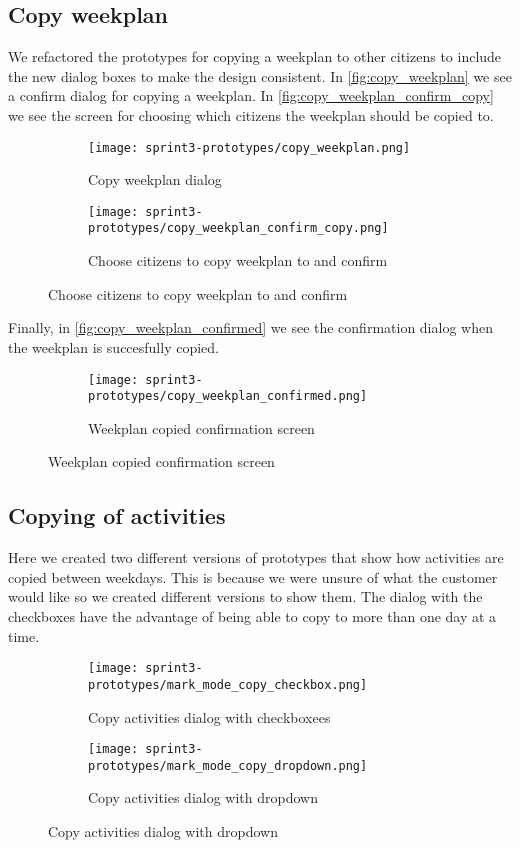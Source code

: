 \subsection{Copy weekplan}
We refactored the prototypes for copying a weekplan to other citizens to include the new dialog boxes to make the design consistent. In \autoref{fig:copy_weekplan} we see a confirm dialog for copying a weekplan. In \autoref{fig:copy_weekplan_confirm_copy} we see the screen for choosing which citizens the weekplan should be copied to. 
\begin{figure}[H]
    \begin{subfigure}{0.5\textwidth}
    \texttt{[image: sprint3-prototypes/copy\_weekplan.png]} 
    \caption{Copy weekplan dialog}
    \label{fig:copy_weekplan}
    \end{subfigure}
    \begin{subfigure}{0.5\textwidth}
        \texttt{[image: sprint3-prototypes/copy\_weekplan\_confirm\_copy.png]}
    \caption{Choose citizens to copy weekplan to and confirm}
    \label{fig:copy_weekplan_confirm_copy}
    \end{subfigure} 
\end{figure}
Finally, in \autoref{fig:copy_weekplan_confirmed} we see the confirmation dialog when the weekplan is succesfully copied.
\begin{figure}[H]
    \begin{subfigure}{0.5\textwidth}
    \texttt{[image: sprint3-prototypes/copy\_weekplan\_confirmed.png]} 
    \caption{Weekplan copied confirmation screen}
    \label{fig:copy_weekplan_confirmed}
    \end{subfigure}
\end{figure}

\subsection{Copying of activities}
Here we created two different versions of prototypes that show how activities are copied between weekdays. This is because we were unsure of what the customer would like so we created different versions to show them. The dialog with the checkboxes have the advantage of being able to copy to more than one day at a time.
\begin{figure}[H]
    \begin{subfigure}{0.5\textwidth}
    \texttt{[image: sprint3-prototypes/mark\_mode\_copy\_checkbox.png]} 
    \caption{Copy activities dialog with checkboxees}
    \label{fig:mark_mode_copy_checkbox}
    \end{subfigure}
    \begin{subfigure}{0.5\textwidth}
        \texttt{[image: sprint3-prototypes/mark\_mode\_copy\_dropdown.png]}
    \caption{Copy activities dialog with dropdown}
    \label{fig:mark_mode_copy_dropdown}
    \end{subfigure} 
\end{figure}

